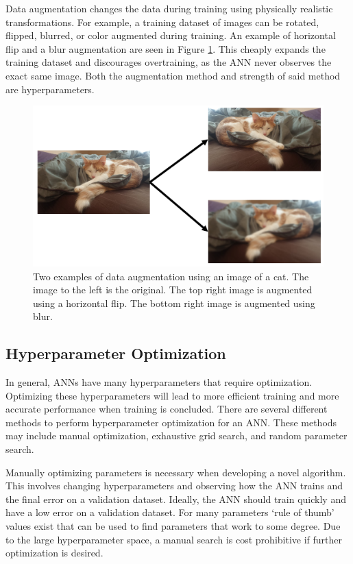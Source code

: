 Data augmentation changes the data during training using physically realistic transformations. For example, a training dataset of images can be rotated, flipped, blurred, or color augmented during training. An example of horizontal flip and a blur augmentation are seen in Figure \ref{fig:cat}. This cheaply expands the training dataset and discourages overtraining, as the ANN never observes the exact same image. Both the augmentation method and strength of said method are hyperparameters. 

\begin{figure}[H]
	\centering
	\includegraphics[width=0.9\linewidth]{images/cat}
	\caption{Two examples of data augmentation using an image of a cat. The image to the left is the original. The top right image is augmented using a horizontal flip. The bottom right image is augmented using blur.}
	\label{fig:cat}
\end{figure}

\subsection{Hyperparameter Optimization}

In general, ANNs have many hyperparameters that require optimization. Optimizing these hyperparameters will lead to more efficient training and more accurate performance when training is concluded. There are several different methods to perform hyperparameter optimization for an ANN. These methods may include manual optimization, exhaustive grid search, and random parameter search.

Manually optimizing parameters is necessary when developing a novel algorithm. This involves changing hyperparameters and observing how the ANN trains and the final error on a validation dataset. Ideally, the ANN should train quickly and have a low error on a validation dataset. For many parameters `rule of thumb' values exist that can be used to find parameters that work to some degree. Due to the large hyperparameter space, a manual search is cost prohibitive if further optimization is desired.


